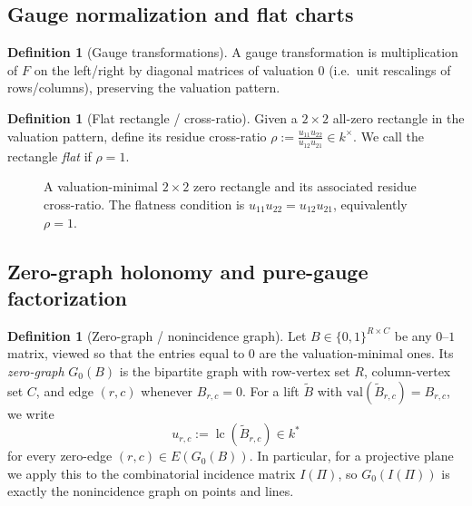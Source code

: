 \documentclass[11pt]{amsart}
\numberwithin{equation}{section}
\theoremstyle{plain}
\theoremstyle{definition}
\newtheorem{definition}[theorem]{Definition}
\theoremstyle{remark}
\newcommand{\val}{\mathrm{val}}
\begin{document}
\subsection{Gauge normalization and flat charts}
\begin{definition}[Gauge transformations]
A gauge transformation is multiplication of $F$ on the left/right by diagonal matrices of valuation $0$
(i.e.\ unit rescalings of rows/columns), preserving the valuation pattern.
\end{definition}

\begin{definition}[Flat rectangle / cross-ratio]
Given a $2\times2$ all-zero rectangle in the valuation pattern, define its residue cross-ratio
$\rho:=\frac{u_{11}u_{22}}{u_{12}u_{21}}\in k^\times$. We call the rectangle \emph{flat} if $\rho=1$.
\end{definition}

\begin{figure}[htbp]
\centering
{}
\caption{A valuation-minimal $2\times2$ zero rectangle and its associated residue cross-ratio. 
The flatness condition is $u_{11}u_{22}=u_{12}u_{21}$, equivalently $\rho=1$.}
\label{fig:flat-rectangle}
\end{figure}



\subsection{Zero-graph holonomy and pure-gauge factorization}
\begin{definition}[Zero-graph / nonincidence graph]
Let $B\in\{0,1\}^{R\times C}$ be any $0$--$1$ matrix, viewed so that the entries equal to $0$ are the valuation-minimal ones.
Its \emph{zero-graph} $G_0(B)$ is the bipartite graph with row-vertex set $R$, column-vertex set $C$, and edge $(r,c)$ whenever
$B_{r,c}=0$. For a lift $\widetilde B$ with $\val(\widetilde B_{r,c})=B_{r,c}$, we write
\[
u_{r,c}:=\operatorname{lc}(\widetilde B_{r,c})\in k^*
\]
for every zero-edge $(r,c)\in E(G_0(B))$. In particular, for a projective plane we apply this to the combinatorial incidence matrix
$I(\Pi)$, so $G_0(I(\Pi))$ is exactly the nonincidence graph on points and lines.
\end{definition}
\end{document}
